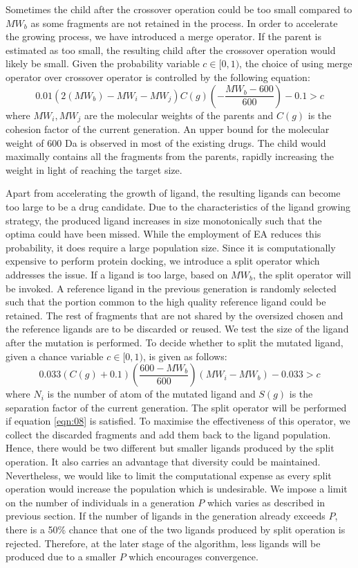 \documentclass[10pt,conference,letterpaper]{IEEEtran}
\begin{document}
 Sometimes the child after the crossover operation could be too small compared to $MW_{b}$ as some fragments are not retained in the process.
In order to accelerate the growing process, we have introduced a merge operator.
If the parent is estimated as too small, the resulting child after the crossover operation would likely be small.
Given the probability variable $c\in [0,1)$, the choice of using merge operator over crossover operator is controlled by the following equation:
\begin{equation}
0.01(2(MW_{b})-MW_{i}-MW_{j})C(g)(-\frac{MW_{b}-600}{600})-0.1 > c \label{eqn:07}
\end{equation}
where $MW_{i},MW_{j}$ are the molecular weights of the parents and $C(g)$ is the cohesion factor of the current generation.
An upper bound for the molecular weight of $600$ Da is observed in most of the existing drugs.
The child would maximally contains all the fragments from the parents, rapidly increasing the weight in light of reaching the target size.

 Apart from accelerating the growth of ligand, the resulting ligands can become too large to be a drug candidate.
Due to the characteristics of the ligand growing strategy, the produced ligand increases in size monotonically such that the optima could have been missed.
While the employment of EA reduces this probability, it does require a large population size.
Since it is computationally expensive to perform protein docking, we introduce a split operator which addresses the issue.
If a ligand is too large, based on $MW_{b}$, the split operator will be invoked.
A reference ligand in the previous generation is randomly selected such that the portion common to the high quality reference ligand could be retained.
The rest of fragments that are not shared by the oversized chosen and the reference ligands are to be discarded or reused. We test the size of the ligand after the mutation is performed.
To decide whether to split the mutated ligand, given a chance variable $c\in [0,1)$, is given as follows:
\begin{equation}
0.033(C(g)+0.1)(\frac{600-MW_{b}}{600})(MW_{i}-MW_{b})-0.033 > c \label{eqn:08}
\end{equation}
where $N_{i}$ is the number of atom of the mutated ligand and $S(g)$ is the separation factor of the current generation.
The split operator will be performed if equation \ref{eqn:08} is satisfied.
To maximise the effectiveness of this operator, we collect the discarded fragments and add them back to the ligand population.
Hence, there would be two different but smaller ligands produced by the split operation.
It also carries an advantage that diversity could be maintained.
Nevertheless, we would like to limit the computational expense as every split operation would increase the population which is undesirable.
We impose a limit on the number of individuals in a generation $P$ which varies as described in previous section.
If the number of ligands in the generation already exceeds $P$, there is a 50\% chance that one of the two ligands produced by split operation is rejected.
Therefore, at the later stage of the algorithm, less ligands will be produced due to a smaller $P$ which encourages convergence.
\end{document}
